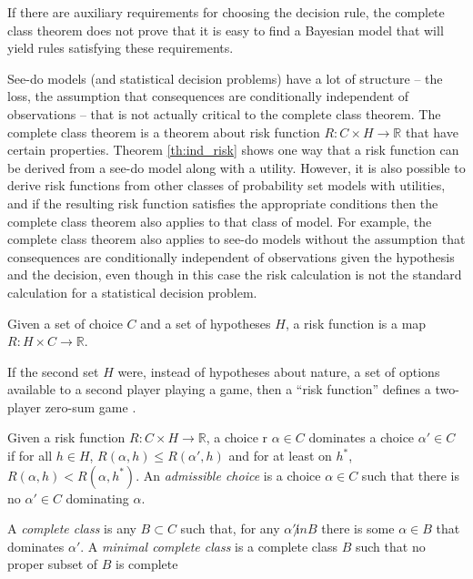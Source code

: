 If there are auxiliary requirements for choosing the decision rule, the complete class theorem does not prove that it is easy to find a Bayesian model that will yield rules satisfying these requirements.

See-do models (and statistical decision problems) have a lot of structure -- the loss, the assumption that consequences are conditionally independent of observations -- that is not actually critical to the complete class theorem. The complete class theorem is a theorem about risk function $R:C\times H\to \mathbb{R}$ that have certain properties. Theorem \ref{th:ind_risk} shows one way that a risk function can be derived from a see-do model along with a utility. However, it is also possible to derive risk functions from other classes of probability set models with utilities, and if the resulting risk function satisfies the appropriate conditions then the complete class theorem also applies to that class of model. For example, the complete class theorem also applies to see-do models without the assumption that consequences are conditionally independent of observations given the hypothesis and the decision, even though in this case the risk calculation is not the standard calculation for a statistical decision problem.

\begin{definition}
Given a set of choice $C$ and a set of hypotheses $H$, a risk function is a map $R:H\times C\to \mathbb{R}$.
\end{definition}

If the second set $H$ were, instead of hypotheses about nature, a set of options available to a second player playing a game, then a ``risk function'' defines a two-player zero-sum game \citet{toutenburg_ferguson_1967}.

\begin{definition}\label{def:admissible_decision}
Given a risk function $R:C\times H\to \mathbb{R}$, a choice r $\alpha\in C$ dominates a choice $\alpha'\in C$ if for all $h\in H$, $R(\alpha,h)\leq R(\alpha',h)$ and for at least on $h^*$, $R(\alpha,h)<R(\alpha,h^*)$. An \emph{admissible choice} is a choice $\alpha\in C$ such that there is no $\alpha'\in C$ dominating $\alpha$.
\end{definition}

\begin{definition}
A \emph{complete class} is any $B\subset C$ such that, for any $\alpha'\not in B$ there is some $\alpha\in B$ that dominates $\alpha'$. A \emph{minimal complete class} is a complete class $B$ such that no proper subset of $B$ is complete
\end{definition}

